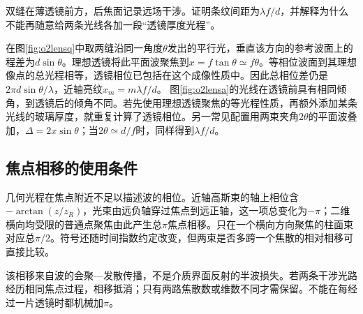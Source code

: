 \begin{example}\label{ex:o2lens}
双缝在薄透镜前方，后焦面记录远场干涉。证明条纹间距为$\lambda f/d$，并解释为什么不能再随意给两条光线各加一段“透镜厚度光程”。
\end{example}
\begin{solution}
在图\ref{fig:o2lensq}中取两缝沿同一角度$\theta$发出的平行光，垂直该方向的参考波面上的程差为$d\sin\theta$。理想透镜将此平面波聚焦到$x=f\tan\theta\simeq f\theta$。等相位波面到其理想像点的总光程相等，透镜相位已包括在这个成像性质中。因此总相位差仍是$2\pi d\sin\theta/\lambda$，近轴亮纹$x_m=m\lambda f/d$。
图\ref{fig:o2lensa}的光线在透镜前具有相同倾角，到透镜后的倾角不同。若先使用理想透镜聚焦的等光程性质，再额外添加某条光线的玻璃厚度，就重复计算了透镜相位。另一常见配置用两束夹角$2\theta$的平面波叠加，$\Delta=2x\sin\theta$；当$2\theta\simeq d/f$时，同样得到$\lambda f/d$。
\end{solution}

\subsection{焦点相移的使用条件}\label{th:o2focus}
几何光程在焦点附近不足以描述波的相位。近轴高斯束的轴上相位含$-\arctan(z/z_R)$，光束由远负轴穿过焦点到远正轴，这一项总变化为$-\pi$；二维横向均受限的普通点聚焦由此产生总$\pi$焦点相移。只在一个横向方向聚焦的柱面束对应总$\pi/2$。符号还随时间指数约定改变，但两束是否多跨一个焦散的相对相移可直接比较。

该相移来自波的会聚—发散传播，不是介质界面反射的半波损失。若两条干涉光路经历相同焦点过程，相移抵消；只有两路焦散数或维数不同才需保留。不能在每经过一片透镜时都机械加$\pi$。

